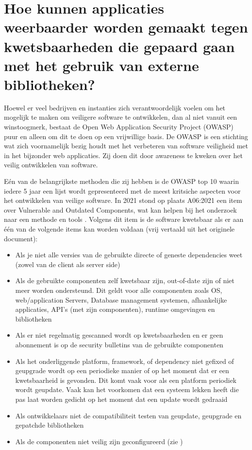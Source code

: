 \section{Hoe kunnen applicaties weerbaarder worden gemaakt tegen kwetsbaarheden die gepaard gaan met het gebruik van externe bibliotheken?}\label{sec:hoe-kan-er-voorkomen-worden-dat-er-kkwetsbaarheden-onstaan-in-een-applicatie-die-gebruik-maakt-van-externe-bibliotheken?}

Hoewel er veel bedrijven en instanties zich verantwoordelijk voelen om het mogelijk te maken om veiligere software te ontwikkelen, dan al niet vanuit een winstoogmerk, bestaat de Open Web Application Security Project (OWASP) puur en alleen om dit te doen op een vrijwillige basis. De OWASP is een stichting wat zich voornamelijk bezig houdt met het verbeteren van software veiligheid met in het bijzonder web applicaties. Zij doen dit door awareness te kweken over het veilig ontwikkelen van software.

Eén van de belangrijkste methoden die zij hebben is de OWASP top 10 waarin iedere 5 jaar een lijst wordt gepresenteerd met de meest kritsiche aspecten voor het ontwikkelen van veilige software. In 2021 stond op plaats A06:2021 een item over Vulnerable and Outdated Components, wat kan helpen bij het onderzoek naar een methode en tools \citep{OWASP:2021}.
Volgens dit item is de software kwetsbaar als er aan één van de volgende items kan worden voldaan (vrij vertaald uit het originele document):
\begin{itemize}
    \item Als je niet alle versies van de gebruikte directe of geneste dependencies weet (zowel van de client als server side)
    \item Als de gebruikte componenten zelf kwetsbaar zijn, out-of-date zijn of niet meer worden ondersteund. Dit geldt voor alle componenten zoals OS, web/application Servers, Database management systemen, afhankelijke applicaties, API's (met zijn componenten), runtime omgevingen en bibliotheken
    \item Als er niet regelmatig gescanned wordt op kwetsbaarheden en er geen abonnement is op de security bulletins van de gebruikte componenten
    \item Als het onderliggende platform, framework, of dependency niet gefixed of geupgrade wordt op een periodieke manier of op het moment dat er een kwetsbaarheid is gevonden. Dit komt vaak voor als een platform periodiek wordt geupdate. Vaak kan het voorkomen dat een systeem lekken heeft die pas laat worden gedicht op het moment dat een update wordt gedraaid
    \item Als ontwikkelaars niet de compatibiliteit testen van geupdate, geupgrade en gepatchde bibliotheken
    \item Als de componenten niet veilig zijn geconfigureerd (zie \citep{OWASP:2021})
\end{itemize}


